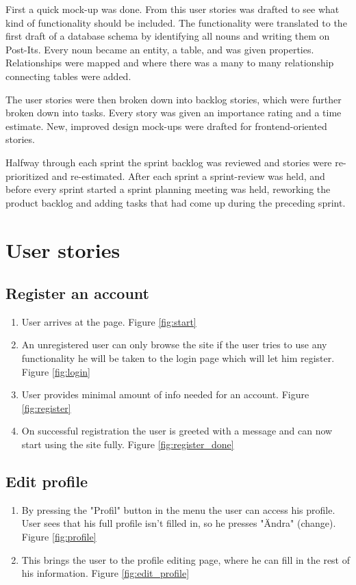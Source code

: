 \documentclass[paper=a4, fontsize=11pt]{report} %
\begin{document}
	First a quick mock-up was done. From this user stories was drafted to see what kind of functionality should be included. The functionality were translated to the first draft of a database schema by identifying all nouns and writing them on Post-Its. Every noun became an entity, a table, and was given properties. Relationships were mapped and where there was a many to many relationship connecting tables were added.

	The user stories were then broken down into backlog stories, which were further broken down into tasks. Every story was given an importance rating and a time estimate. New, improved design mock-ups were drafted for frontend-oriented stories.

	Halfway through each sprint the sprint backlog was reviewed and stories were re-prioritized and re-estimated. After each sprint a sprint-review was held, and before every sprint started a sprint planning meeting was held, reworking the product backlog and adding tasks that had come up during the preceding sprint.

\section*{User stories}

	\subsection*{Register an account}
	\begin{enumerate}
		\item User arrives at the page. Figure \ref{fig:start}
		\item An unregistered user can only browse the site if the user tries to use any functionality he will be taken to the login page which will let him register. Figure \ref{fig:login}
		\item User provides minimal amount of info needed for an account. Figure \ref{fig:register}
		\item On successful registration the user is greeted with a message and can now start using the site fully. Figure \ref{fig:register_done}
	\end{enumerate}


	\subsection*{Edit profile}
	\begin{enumerate}
		\item By pressing the "Profil" button in the menu the user can access his profile. User sees that his full profile isn't filled in, so he presses "Ändra" (change). Figure \ref{fig:profile}
		\item This brings the user to the profile editing page, where he can fill in the rest of his information. Figure \ref{fig:edit_profile}
	\end{enumerate}
\end{document}
